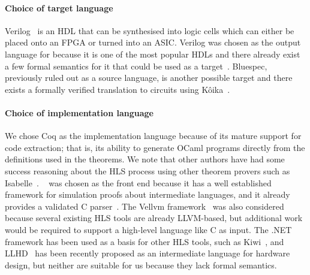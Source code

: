 \paragraph{Choice of target language}
Verilog~\cite{06_ieee_stand_veril_hardw_descr_languag} is an \gls{HDL} that can
be synthesised into logic cells which can either be placed onto an \gls{FPGA} or
turned into an \gls{ASIC}.  Verilog was chosen as the output language for
\vericert{} because it is one of the most popular HDLs and there already exist a
few formal semantics for it that could be used as a
target~\cite{lööw19_verif_compil_verif_proces, meredith10_veril}.  Bluespec,
previously ruled out as a source language, is another possible target and there
exists a formally verified translation to circuits using
K\^{o}ika~\cite{bourgeat20_essen_blues}. %


\paragraph{Choice of implementation language}
We chose Coq as the implementation language because of its mature support for
code extraction; that is, its ability to generate OCaml programs directly from
the definitions used in the theorems.  We note that other authors have had some
success reasoning about the HLS process using other theorem provers such as
Isabelle~\cite{ellis08_csicgfu}.
\compcert{}~\cite{leroy09_formal_verif_realis_compil} was chosen as the front
end because it has a well established framework for simulation proofs about
intermediate languages, and it already provides a validated C
parser~\cite{jourdan12_valid_lr_parser}.  The Vellvm
framework~\cite{zhao12_formal_llvm_inter_repres_verif_progr_trans} was also
considered because several existing HLS tools are already LLVM-based, but
additional work would be required to support a high-level language like C as
input.  The .NET framework has been used as a basis for other HLS tools, such as
Kiwi~\cite{greaves08_kiwi}, and LLHD~\cite{schuiki20_llhd} has been recently
proposed as an intermediate language for hardware design, but neither are
suitable for us because they lack formal semantics.

